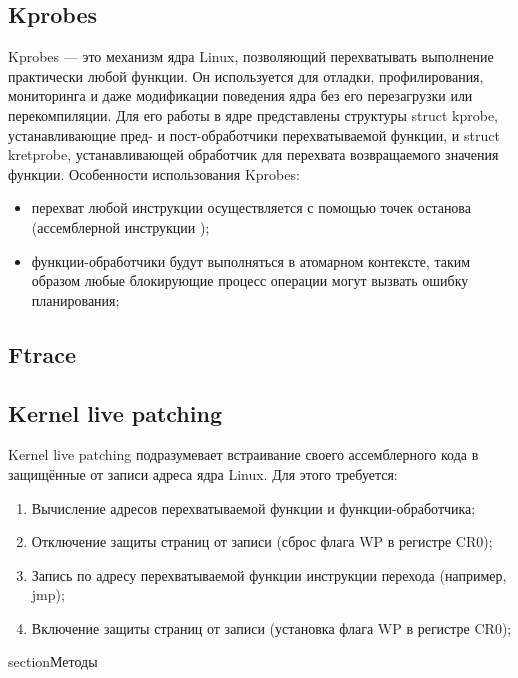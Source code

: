 \documentclass{bmstu}
\begin{document}
\subsection{Kprobes}
Kprobes — это механизм ядра Linux, позволяющий перехватывать выполнение практически любой функции. Он используется для отладки, профилирования, мониторинга и даже модификации поведения ядра без его перезагрузки или перекомпиляции. Для его работы в ядре представлены структуры struct kprobe, устанавливающие пред- и пост-обработчики перехватываемой функции, и struct kretprobe, устанавливающей обработчик для перехвата возвращаемого значения функции. %
Особенности использования Kprobes:
\begin{itemize}
	\item перехват любой инструкции осуществляется с помощью точек останова (ассемблерной инструкции );
	\item функции-обработчики будут выполняться в атомарном контексте, таким образом любые блокирующие процесс операции могут вызвать ошибку планирования;
\end{itemize}

\subsection{Ftrace}

\subsection{Kernel live patching} %
Kernel live patching подразумевает встраивание своего ассемблерного кода в защищённые от записи адреса ядра Linux. Для этого требуется:
\begin{enumerate}
	\item Вычисление адресов перехватываемой функции и функции-обработчика;
	\item Отключение защиты страниц от записи (сброс флага WP в регистре CR0);
	\item Запись по адресу перехватываемой функции инструкции перехода (например, jmp);
	\item Включение защиты страниц от записи (установка флага WP в регистре CR0);
\end{enumerate}

section{Методы }
\end{document}
